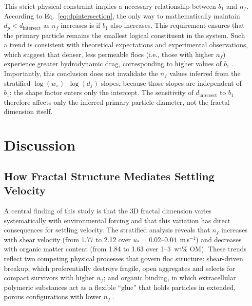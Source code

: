 \documentclass{agujournal2019}
\begin{document}
This strict physical constraint implies a necessary relationship between $b_1$ and $n_f$. According to Eq.~\eqref{eq:dpintersection}, the only way to mathematically maintain $d_p < d_\text{intersect}$ as $n_f$ increases is if $b_1$ also increases. This requirement ensures that the primary particle remains the smallest logical constituent in the system. Such a trend is consistent with theoretical expectations and experimental observations, which suggest that denser, less permeable flocs (i.e., those with higher $n_f$) experience greater hydrodynamic drag, corresponding to higher values of $b_1$ \cite{strom2011explicit}. Importantly, this conclusion does not invalidate the $n_f$ values inferred from the stratified $\log(w_s)$--$\log(d_f)$ slopes, because those slopes are independent of $b_1$; the shape factor enters only the intercept. The sensitivity of $d_\text{intersect}$ to $b_1$ therefore affects only the inferred primary particle diameter, not the fractal dimension itself.

\section{Discussion}

\subsection{How Fractal Structure Mediates Settling Velocity}

A central finding of this study is that the 3D fractal dimension varies systematically with environmental forcing and that this variation has direct consequences for settling velocity. The stratified analysis reveals that $n_f$ increases with shear velocity (from 1.77 to 2.12 over $u_* = 0.02$--$0.04$~m\,s$^{-1}$) and decreases with organic matter content (from 1.84 to 1.63 over 1--3~wt\% OM). These trends reflect two competing physical processes that govern floc structure: shear-driven breakup, which preferentially destroys fragile, open aggregates and selects for compact survivors with higher $n_f$; and organic binding, in which extracellular polymeric substances act as a flexible ``glue'' that holds particles in extended, porous configurations with lower $n_f$ \cite{nghiem2022mechanistic}.
\end{document}
